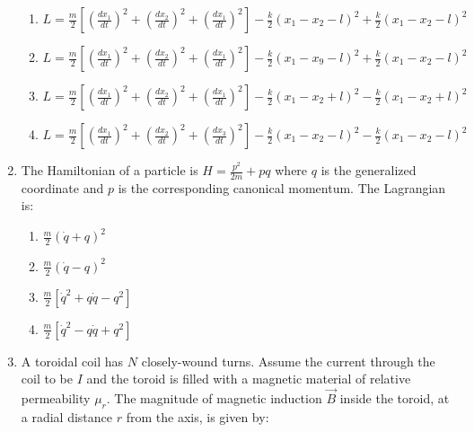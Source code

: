 \documentclass[journal,13pt,onecolumn]{IEEEtran}
\begin{document}
\begin{enumerate}[itemsep = 1em]
\hfill{}

\begin{enumerate}
\item $L = \frac{m}{2} \left[ \left( \frac{dx_{1}}{dt} \right)^{2} + \left( \frac{dx_{2}}{dt} \right)^{2} + \left( \frac{dx_{1}}{dt} \right)^{2} \right] 
- \frac{k}{2} \left( x_{1} - x_{2} - l \right)^{2} + \frac{k}{2} \left( x_{1} - x_{2} - l \right)^{2}$

\item $L = \frac{m}{2} \left[ \left( \frac{dx_{1}}{dt} \right)^{2} + \left( \frac{dx_{2}}{dt} \right)^{2} + \left( \frac{dx_{1}}{dt} \right)^{2} \right] 
- \frac{k}{2} \left( x_{1} - x_{9} - l \right)^{2} + \frac{k}{2} \left( x_{1} - x_{2} - l \right)^{2}$

\item $L = \frac{m}{2} \left[ \left( \frac{dx_{1}}{dt} \right)^{2} + \left( \frac{dx_{2}}{dt} \right)^{2} + \left( \frac{dx_{1}}{dt} \right)^{2} \right] 
- \frac{k}{2} \left( x_{1} - x_{2} + l \right)^{2} - \frac{k}{2} \left( x_{1} - x_{2} + l \right)^{2}$

\item $L = \frac{m}{2} \left[ \left( \frac{dx_{1}}{dt} \right)^{2} + \left( \frac{dx_{2}}{dt} \right)^{2} + \left( \frac{dx_{3}}{dt} \right)^{2} \right] 
- \frac{k}{2} \left( x_{1} - x_{2} - l \right)^{2} - \frac{k}{2} \left( x_{1} - x_{2} - l \right)^{2}$
\end{enumerate}

\item The Hamiltonian of a particle is $H = \frac{p^{2}}{2m} + pq$ where $q$ is the generalized coordinate and $p$ is the corresponding canonical momentum. The Lagrangian is:

\hfill{}

\begin{enumerate}
\item $\frac{m}{2} \left( \dot{q} + q \right)^{2}$
\item $\frac{m}{2} \left( \dot{q} - q \right)^{2}$
\item $\frac{m}{2} \left[ \dot{q}^{2} + q \dot{q} - q^{2} \right]$
\item $\frac{m}{2} \left[ \dot{q}^{2} - q \dot{q} + q^{2} \right]$
\end{enumerate}

\item A toroidal coil has $N$ closely-wound turns. Assume the current through the coil to be $I$ and the toroid is filled with a magnetic material of relative permeability $\mu_{r}$. The magnitude of magnetic induction $\vec{B}$ inside the toroid, at a radial distance $r$ from the axis, is given by:


\end{enumerate}
\end{document}
